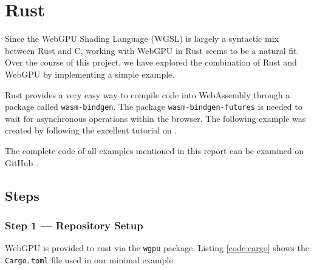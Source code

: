 %
%
% 
% 

\newcommand*{\rustsnippet}[3]{
  \inputminted[
    frame=lines,
    framesep=2mm,
    baselinestretch=1.2,
    linenos,
    fontsize=\scriptsize,
    firstline=#1,
    lastline=#2
  ]{rust}{#3}}

\newcommand*{\rust}[1]{
  \inputminted[
    frame=lines,
    framesep=2mm,
    baselinestretch=1.2,
    linenos,
    fontsize=\scriptsize,
    breaklines=true,
    highlightlines={30-33,42-49}
  ]{rust}{#1}}


\chapter{Rust}

\label{chap:Rust}

Since the WebGPU Shading Language (WGSL) is largely a syntactic mix between Rust and C,
working with WebGPU in Rust seems to be a natural fit.
Over the course of this project, we have explored the combination of Rust and WebGPU by implementing a simple example.

Rust provides a very easy way to compile code into WebAssembly through a package called \lstinline{wasm-bindgen}.
The package \lstinline{wasm-bindgen-futures} is needed to wait for asynchronous operations within the browser.
The following example was created by following the excellent tutorial on \textcite{rust-wgpu}.

The complete code of all examples mentioned in this report can be examined on GitHub \parencite{github-repo}.


\section{Steps}


\subsection{Step 1 --- Repository Setup}
WebGPU is provided to rust via the \lstinline{wgpu} package.
Listing \ref{code:cargo} shows the \lstinline{Cargo.toml} file used in our minimal example.

